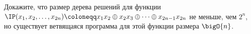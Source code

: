 Докажите, что размер дерева решений для функции $\IP(x_1, x_2, \dots, x_{2n}) \coloneqq x_1x_2 \oplus
x_2x_3 \oplus \dots \oplus x_{2n - 1}x_{2n}$ не меньше, чем $2^n$, но существует ветвящаяся программа для
этой функции размера $\bigO{n}$.